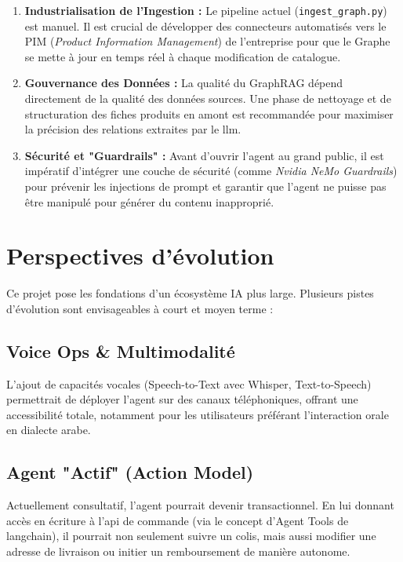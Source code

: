 \begin{enumerate}
    \item \textbf{Industrialisation de l'Ingestion :} Le pipeline actuel (\texttt{ingest\_graph.py}) est manuel. Il est crucial de développer des connecteurs automatisés vers le PIM (\textit{Product Information Management}) de l'entreprise pour que le Graphe se mette à jour en temps réel à chaque modification de catalogue.
    \item \textbf{Gouvernance des Données :} La qualité du GraphRAG dépend directement de la qualité des données sources. Une phase de nettoyage et de structuration des fiches produits en amont est recommandée pour maximiser la précision des relations extraites par le \gls{llm}.
    \item \textbf{Sécurité et "Guardrails" :} Avant d'ouvrir l'agent au grand public, il est impératif d'intégrer une couche de sécurité (comme \textit{Nvidia NeMo Guardrails}) pour prévenir les injections de prompt et garantir que l'agent ne puisse pas être manipulé pour générer du contenu inapproprié.
\end{enumerate}

\section{Perspectives d'évolution}

Ce projet pose les fondations d'un écosystème IA plus large. Plusieurs pistes d'évolution sont envisageables à court et moyen terme :

\subsection{Voice Ops \& Multimodalité}
L'ajout de capacités vocales (Speech-to-Text avec Whisper, Text-to-Speech) permettrait de déployer l'agent sur des canaux téléphoniques, offrant une accessibilité totale, notamment pour les utilisateurs préférant l'interaction orale en dialecte arabe.

\subsection{Agent "Actif" (Action Model)}
Actuellement consultatif, l'agent pourrait devenir transactionnel. En lui donnant accès en écriture à l'\gls{api} de commande (via le concept d'Agent Tools de \gls{langchain}), il pourrait non seulement suivre un colis, mais aussi modifier une adresse de livraison ou initier un remboursement de manière autonome.

